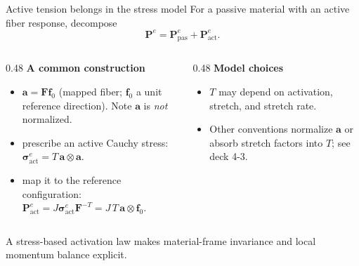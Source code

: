 \documentclass[aspectratio=169,11pt]{beamer}
\newcommand{\Ften}{\bm{F}}
\newcommand{\Pten}{\bm{P}^{e}}
\newcommand{\estress}{\bm{\sigma}^{e}}
\begin{document}
\begin{frame}{Active tension belongs in the stress model}
For a passive material with an active fiber response, decompose
\[
\Pten=\Pten_{\mathrm{pas}}+\Pten_{\mathrm{act}}.
\]

\begin{columns}[T,onlytextwidth]
\begin{column}{0.48\textwidth}
\textbf{A common construction}
\begin{itemize}\itemsep6pt
  \item \(\bm{a}=\Ften\bm{f}_0\) (mapped fiber; \(\bm{f}_0\) a unit reference direction). Note \(\bm{a}\) is \emph{not} normalized.
  \item prescribe an active Cauchy stress:
  \(\estress_{\mathrm{act}}=T\,\bm{a}\otimes\bm{a}\).
  \item map it to the reference configuration:
  \(\Pten_{\mathrm{act}}=J\estress_{\mathrm{act}}\Ften^{-T}
   =J\,T\,\bm{a}\otimes\bm{f}_0\).
\end{itemize}
\end{column}
\begin{column}{0.48\textwidth}
\textbf{Model choices}
\begin{itemize}\itemsep6pt
  \item \(T\) may depend on activation, stretch, and stretch rate.
  \item Other conventions normalize \(\bm{a}\) or absorb stretch factors into \(T\); see deck 4-3.
\end{itemize}
\end{column}
\end{columns}

\medskip
\begin{punchbox}
A stress-based activation law makes material-frame invariance and local momentum balance explicit.
\end{punchbox}
\end{frame}
\end{document}
